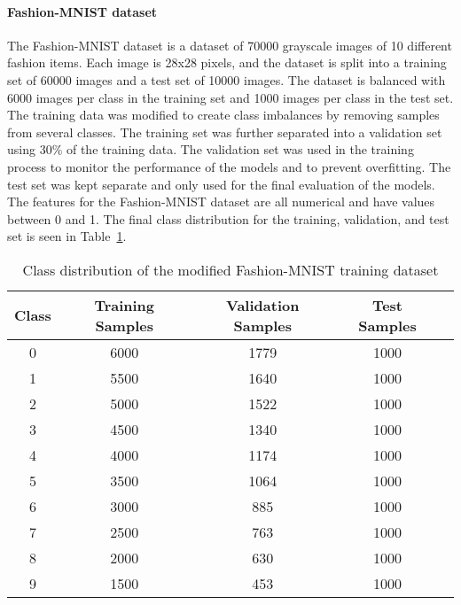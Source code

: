 \documentclass[conference]{IEEEtran}
\begin{document}
\paragraph{Fashion-MNIST dataset}
The Fashion-MNIST dataset \cite{xiao2017fashionmnist} is a dataset of 70000 grayscale images of 10 different fashion items. Each image is 28x28 pixels, and the 
dataset is split into a training set of 60000 images and a test set of 10000 images. The dataset is balanced with 6000 images per class in 
the training set and 1000 images per class in the test set. The training data was modified to create class imbalances by removing samples from 
several classes. The training set was further separated into a validation set using 30\% of the training data. The validation set was used in the training process to monitor 
the performance of the models and to prevent overfitting. The test set was kept separate and only used for the final evaluation of the models. The features for the 
Fashion-MNIST dataset are all numerical and have values between 0 and 1. 
The final class distribution for the training, validation, and test set is seen in Table~\ref{tab:fashion_mnist_class_dist}.
\begin{table}[H]
  \centering
  \begin{tabular}{|c|c|c|c|c|}
    \hline
 Class & Training Samples & Validation Samples & Test Samples \\
    \hline
 0 & 6000 & 1779 & 1000\\
 1 & 5500 & 1640 & 1000\\
 2 & 5000 & 1522 & 1000\\
 3 & 4500 & 1340 & 1000\\
 4 & 4000 & 1174 & 1000\\
 5 & 3500 & 1064 & 1000\\
 6 & 3000 & 885 & 1000\\
 7 & 2500 & 763 & 1000\\
 8 & 2000 & 630 & 1000\\
 9 & 1500 & 453 & 1000\\
    \hline
  \end{tabular}
  \caption{Class distribution of the modified Fashion-MNIST training dataset}
  \label{tab:fashion_mnist_class_dist}
\end{table}
\end{document}
